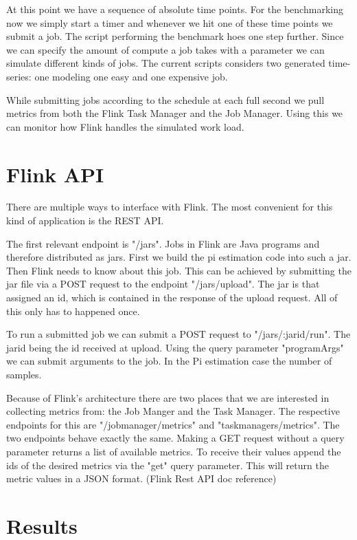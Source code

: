 At this point we have a sequence of absolute time points. For the benchmarking now we simply start a timer and whenever we hit one of these time points we submit a job. The script performing the benchmark hoes one step further. Since we can specify the amount of compute a job takes with a parameter we can simulate different kinds of jobs. The current scripts considers two generated time-series: one modeling one easy and one expensive job. 

While submitting jobs according to the schedule at each full second we pull metrics from both the Flink Task Manager and the Job Manager. Using this we can monitor how Flink handles the simulated work load.

\section{Flink API}

There are multiple ways to interface with Flink. The most convenient for this kind of application is the REST API. 

The first relevant endpoint is "/jars". Jobs in Flink are Java programs and therefore distributed as jars. First we build the pi estimation code into such a jar. Then Flink needs to know about this job. This can be achieved by submitting the jar file via a POST request to the endpoint "/jars/upload". The jar is that assigned an id, which is contained in the response of the upload request. All of this only has to happened once. 

To run a submitted job we can submit a POST request to "/jars/:jarid/run". The jarid being the id received at upload. Using the query parameter "programArgs" we can submit arguments to the job. In the Pi estimation case the number of samples. 

Because of Flink's architecture there are two places that we are interested in collecting metrics from: the Job Manger and the Task Manager. The respective endpoints for this are "/jobmanager/metrics" and "taskmanagers/metrics". The two endpoints behave exactly the same. Making a GET request without a query parameter returns a list of available metrics. To receive their values append the ids of the desired metrics via the "get" query parameter. This will return the metric values in a JSON format. (Flink Rest API doc reference)

\section{Results}



